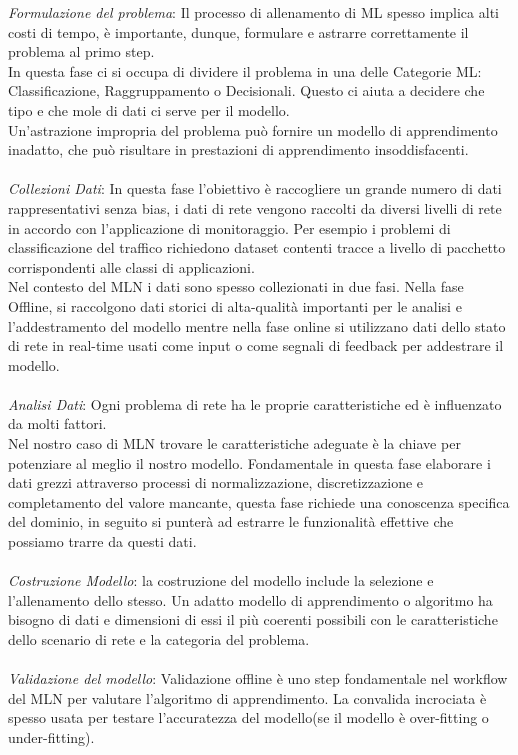 \documentclass[../tesi.tex]{subfiles}
\begin{document}
\textit{Formulazione del problema}: Il processo di allenamento di ML spesso implica alti costi di tempo, è importante, dunque, formulare e astrarre correttamente il problema al primo step.\\
In questa fase ci si occupa di dividere il problema in una delle Categorie ML: Classificazione, Raggruppamento o Decisionali.
Questo ci aiuta a decidere che tipo e che mole di dati ci serve per il modello.\\
Un'astrazione impropria del problema può fornire un modello di apprendimento inadatto, che può risultare in prestazioni di apprendimento insoddisfacenti.\\
\\
\textit{Collezioni Dati}: In questa fase l’obiettivo è raccogliere un grande numero di dati rappresentativi senza bias, i dati di rete vengono raccolti da diversi livelli di rete in  accordo con l’applicazione di monitoraggio. Per esempio i problemi di classificazione del traffico  richiedono dataset contenti tracce a livello di pacchetto corrispondenti alle classi di applicazioni.\\
Nel contesto del MLN i dati sono spesso collezionati in due fasi.
Nella fase Offline, si raccolgono dati storici di alta-qualità importanti per le analisi e l’addestramento del modello mentre nella fase online si utilizzano dati dello stato di rete in real-time usati come input o come segnali di feedback per addestrare il modello.\\
\\
\textit{Analisi Dati}: Ogni problema di rete ha le proprie caratteristiche ed è influenzato da molti fattori.\\ 
Nel nostro caso di MLN trovare le caratteristiche adeguate è la chiave per potenziare al meglio il nostro modello.
Fondamentale in questa fase elaborare i dati grezzi attraverso processi di normalizzazione, discretizzazione e completamento del valore mancante, questa fase richiede una conoscenza specifica del dominio, in seguito si punterà ad estrarre le funzionalità effettive che possiamo trarre da questi dati.\\
\\
\textit{Costruzione Modello}: la costruzione del modello include la selezione e l’allenamento dello stesso. 
Un adatto modello di apprendimento o algoritmo ha bisogno di dati e dimensioni di essi il più coerenti possibili con le caratteristiche dello scenario di rete e la categoria del problema.\\
\\
\textit{Validazione del modello}: Validazione offline è uno step fondamentale nel workflow del MLN per valutare l’algoritmo di apprendimento. La convalida incrociata è spesso usata per testare l’accuratezza del modello(se il modello è \Gls{over-fitting} o \Gls{under-fitting}).
\end{document}
